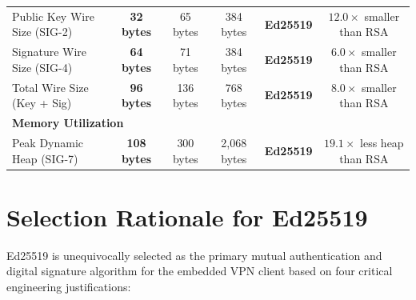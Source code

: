 \documentclass[11pt,a4paper]{article}
\begin{document}
\begin{table}[htbp]
\begin{tabular}{l c c c c c}
Public Key Wire Size (SIG-2)    & \textbf{32 bytes}  & 65 bytes   & 384 bytes     & \textbf{Ed25519} & $12.0\times$ smaller than RSA \\
Signature Wire Size (SIG-4)     & \textbf{64 bytes}  & 71 bytes   & 384 bytes     & \textbf{Ed25519} & $6.0\times$ smaller than RSA \\
Total Wire Size (Key + Sig)     & \textbf{96 bytes}  & 136 bytes  & 768 bytes     & \textbf{Ed25519} & $8.0\times$ smaller than RSA \\
\midrule
\multicolumn{6}{l}{\textbf{Memory Utilization}} \\
Peak Dynamic Heap (SIG-7)       & \textbf{108 bytes} & 300 bytes  & 2,068 bytes   & \textbf{Ed25519} & $19.1\times$ less heap than RSA \\
\bottomrule
\end{tabular}
\end{table}

\section{Selection Rationale for Ed25519}

Ed25519 is unequivocally selected as the primary mutual authentication and digital signature algorithm for the embedded VPN client based on four critical engineering justifications:
\end{document}
